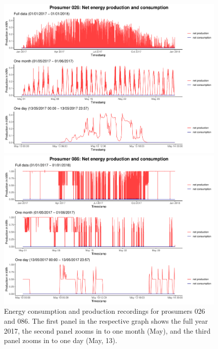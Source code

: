 \begin{figure}
\centering
\begin{minipage}[h]{\dimexpr.5\textwidth-0.15em}
\includegraphics[width=\textwidth]{thesis/graphs/timeseries/p026_prod&cons.pdf}
\end{minipage}
\begin{minipage}[h]{\dimexpr.5\textheight-0.15em}
\includegraphics[width=\textwidth]{thesis/graphs/timeseries/p086_prod&cons.pdf}
\end{minipage}

\caption[Energy consumption and production recordings for prosumers 026 and 086]{Energy consumption and production recordings for prosumers 026 and 086. The first panel in the respective graph shows the full year 2017, the second panel zooms in to one month (May), and the third panel zooms in to one day (May, 13). \quantnet}
\label{Fig:energyconsprod_p026p086}

\end{figure}

